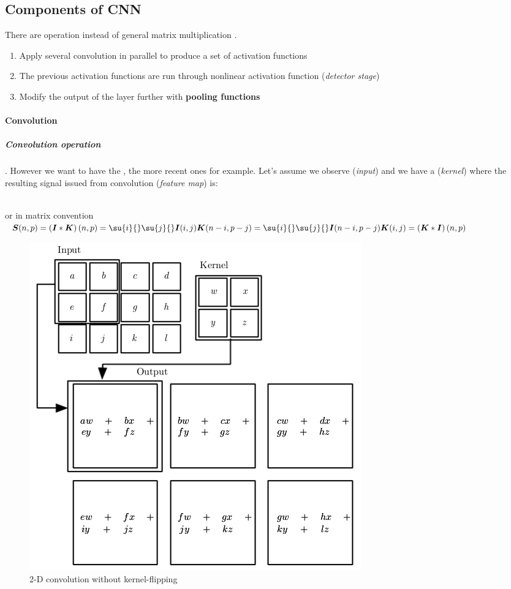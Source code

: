 \subsection{Components of CNN}
There are  operation instead of general 
matrix multiplication .
\begin{enumerate}
    \item Apply several convolution in parallel to produce a set of activation 
        functions
    \item The previous activation functions are run through nonlinear activation 
        function (\emph{detector stage})
    \item Modify the output of the layer further with \textbf{pooling functions}
\end{enumerate}

\paragraph{Convolution}
\subparagraph{Convolution operation} . However we want 
to have the , the more recent ones
for example.
Let's assume we observe  (\emph{input}) and we have a (\emph{kernel}) where  the
resulting signal issued from convolution (\emph{feature map}) is:
\begin{center}
    \\
    or in matrix convention\\
    $\bm{S}(n,p) = \left(\bm{I}*\bm{K}\right)(n, p) = \su{i}{}\su{j}{}\bm{I}(i, j)
    \bm{K}(n-i, p-j) = \su{i}{}\su{j}{}\bm{I}(n-i, p-j) \bm{K}(i, j) =
    \left(\bm{K}*\bm{I}\right)(n, p)$ 
\end{center}
\begin{figure}[H]
    \begin{center}
        \includegraphics[width=.5\textwidth]{./chapters/4_deep_learning/3_types_of_neural_networks/images/01_convolutional_graph.png}
    \end{center}
    \caption{2-D convolution without kernel-flipping}
    \label{fig:01_convolutional_graph}
\end{figure}


